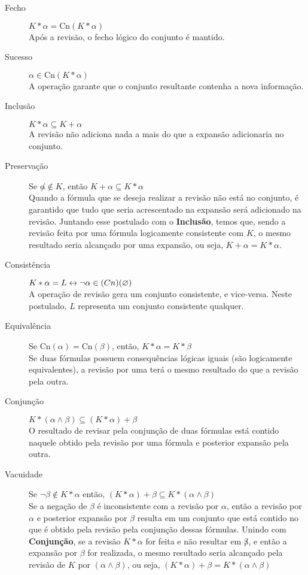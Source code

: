\begin{description}
	\item[Fecho] $ K \ast \alpha = \text{Cn}(K \ast \alpha) $ \\ Após a revisão, o fecho lógico do conjunto é mantido.
	\item[Sucesso] $ \alpha \in \text{Cn}(K \ast \alpha) $ \\ A operação garante que o conjunto resultante contenha a nova informação.
	\item[Inclusão] $ K \ast \alpha \subseteq K + \alpha $ \\ A revisão não adiciona nada a mais do que a expansão adicionaria no conjunto.
	\item[Preservação] Se $ \not \alpha \notin K $, então $ K + \alpha \subseteq K \ast \alpha $ \\ Quando a fórmula que se deseja realizar a revisão não está no conjunto, é garantido que tudo que seria acrescentado na expansão será adicionado na revisão. Juntando esse postulado com o \textbf{Inclusão}, temos que, sendo a revisão feita por uma fórmula logicamente consistente com $ K $, o mesmo resultado seria alcançado por uma expansão, ou seja, $ K + \alpha = K \ast \alpha $. 
	\item[Consistência] $ K \ast \alpha = L \leftrightarrow \lnot \alpha \in \text(Cn)(\varnothing)$ \\ A operação de revisão gera um conjunto consistente, e vice-versa. Neste postulado, $ L $ representa um conjunto consistente qualquer.
	\item[Equivalência] Se $ \text{Cn}(\alpha) = \text{Cn}(\beta) $, então, $ K \ast \alpha = K \ast \beta $ \\ Se duas fórmulas possuem consequências lógicas iguais (são logicamente equivalentes), a revisão por uma terá o mesmo resultado do que a revisão pela outra.
	\item[Conjunção] $ K \ast (\alpha \land \beta) \subseteq (K \ast \alpha) + \beta $ \\ O resultado de revisar pela conjunção de duas fórmulas está contido naquele obtido pela revisão por uma fórmula e posterior expansão pela outra.
	\item[Vacuidade] Se $ \lnot \beta \notin K \ast \alpha $ então, $ (K \ast \alpha) + \beta \subseteq K \ast (\alpha \land \beta) $ \\ Se a negação de $ \beta $ é inconsistente com a revisão por $ \alpha $, então a revisão por $ \alpha $ e posterior expansão por $ \beta $ resulta em um conjunto que está contido no que é obtido pela revisão pela conjunção dessas fórmulas. Unindo com \textbf{Conjunção}, se a revisão $ K \ast \alpha $ for feita e não resultar em $ \not \beta $, e então a expansão por $ \beta $ for realizada, o mesmo resultado seria alcançado pela revisão de $ K $ por $ (\alpha \land \beta) $, ou seja, $ (K \ast \alpha) + \beta = K \ast (\alpha \land \beta) $    
\end{description}

